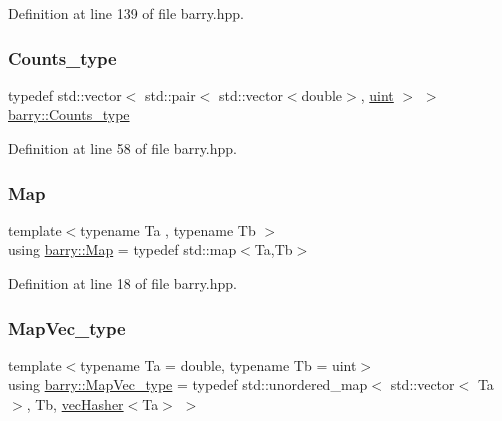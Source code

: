 Definition at line 139 of file barry.\+hpp.

\mbox{\label{namespacebarry_a3e2d8c3b6cf602107559d4237d9f1315}} 
\subsubsection{\texorpdfstring{Counts\+\_\+type}{Counts\_type}}
{\footnotesize\ttfamily typedef std\+::vector$<$ std\+::pair$<$ std\+::vector$<$double$>$, \hyperlink{namespacebarry_a11dfc53ddb4672278319aa04f1e09a6c}{uint} $>$ $>$ \hyperlink{namespacebarry_a3e2d8c3b6cf602107559d4237d9f1315}{barry\+::\+Counts\+\_\+type}}



Definition at line 58 of file barry.\+hpp.

\mbox{\label{namespacebarry_a979a04835a9855ff2054c383c569c89e}} 
\subsubsection{\texorpdfstring{Map}{Map}}
{\footnotesize\ttfamily template$<$typename Ta , typename Tb $>$ \\
using \hyperlink{namespacebarry_a979a04835a9855ff2054c383c569c89e}{barry\+::\+Map} = typedef std\+::map$<$Ta,Tb$>$}



Definition at line 18 of file barry.\+hpp.

\mbox{\label{namespacebarry_a2f0d3aab1d67e4c8eaeab9022e16139f}} 
\subsubsection{\texorpdfstring{Map\+Vec\+\_\+type}{MapVec\_type}}
{\footnotesize\ttfamily template$<$typename Ta  = double, typename Tb  = uint$>$ \\
using \hyperlink{namespacebarry_a2f0d3aab1d67e4c8eaeab9022e16139f}{barry\+::\+Map\+Vec\+\_\+type} = typedef std\+::unordered\+\_\+map$<$ std\+::vector$<$ Ta $>$, Tb, \hyperlink{structbarry_1_1vec_hasher}{vec\+Hasher}$<$Ta$>$ $>$}



